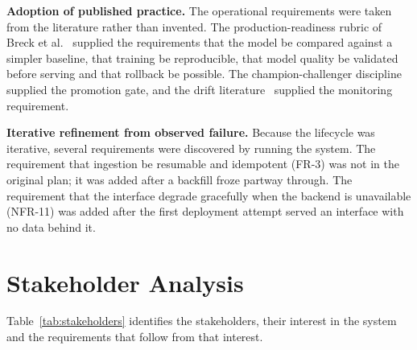 \textbf{Adoption of published practice.} The operational requirements were taken
from the literature rather than invented. The production-readiness rubric of
Breck et al.~\cite{ref:mltestscore} supplied the requirements that the model be
compared against a simpler baseline, that training be reproducible, that model
quality be validated before serving and that rollback be possible. The
champion-challenger discipline~\cite{ref:siddiqi} supplied the promotion gate,
and the drift literature~\cite{ref:driftsurvey} supplied the monitoring
requirement.

\textbf{Iterative refinement from observed failure.} Because the lifecycle was
iterative, several requirements were discovered by running the system. The
requirement that ingestion be resumable and idempotent (FR-3) was not in the
original plan; it was added after a backfill froze partway through. The
requirement that the interface degrade gracefully when the backend is unavailable
(NFR-11) was added after the first deployment attempt served an interface with no
data behind it.

\section{Stakeholder Analysis}
Table~\ref{tab:stakeholders} identifies the stakeholders, their interest in the
system and the requirements that follow from that interest.

